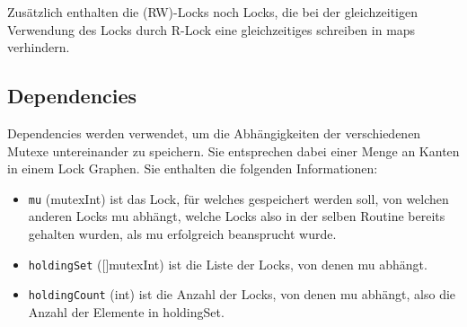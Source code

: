 Zusätzlich enthalten die (RW)-Locks noch Locks, die bei der gleichzeitigen Verwendung 
des Locks durch R-Lock eine gleichzeitiges schreiben in maps verhindern.   
\subsection{Dependencies}
Dependencies werden verwendet, um die Abhängigkeiten der verschiedenen Mutexe 
untereinander zu speichern. Sie entsprechen dabei einer Menge an Kanten in einem 
Lock Graphen. Sie enthalten die folgenden Informationen:
\begin{itemize}
  \item \texttt{mu} (mutexInt) ist das Lock, für welches gespeichert werden soll, von 
   welchen anderen Locks mu abhängt, welche Locks also in der selben Routine 
   bereits gehalten wurden, als mu erfolgreich beansprucht wurde.
  \item \texttt{holdingSet} ([]mutexInt) ist die Liste der Locks, von denen mu abhängt.
  \item \texttt{holdingCount} (int) ist die Anzahl der Locks, von denen mu abhängt,
   also die Anzahl der Elemente in holdingSet.
\end{itemize}
